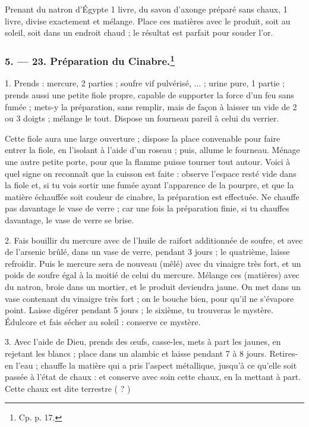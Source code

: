 \documentclass[a4paper, 11pt, oneside, polutonikogreek, french]{article}
\begin{document}
Prenant du natron d'Égypte 1 livre, du savon d'axonge préparé sans chaux, 1 livre, divise exactement et mélange. Place ces matières avec le produit, soit au soleil, soit dans un endroit chaud ; le résultat est parfait pour souder l'or.

\bigskip
\centerline{\EightStarTaper}
\centerline{\EightStarTaper\EightStarTaper}
\bigskip

\subsubsection[5. --- 23. Préparation du Cinabre.]{5. --- 23. Préparation du Cinabre.\footnote{Cp. p. 17.}}

1. Prends : mercure, 2 parties ; soufre vif pulvérisé, ... ; urine pure, 1 partie ; prends aussi une petite fiole propre, capable de supporter la force d'un feu sans fumée ; mets-y la préparation, sans remplir, mais de façon à laisser un vide de 2 ou 3 doigts ; mélange le tout. Dispose un fourneau pareil à celui du verrier.

Cette fiole aura une large ouverture ; dispose la place convenable pour faire entrer la fiole, en l'isolant à l'aide d'un roseau ; puis, allume le fourneau. Ménage une autre petite porte, pour que la flamme puisse tourner tout autour. Voici à quel signe on reconnaît que la cuisson est faite : observe l'espace resté vide dans la fiole et, si tu vois sortir une fumée ayant l'apparence de la pourpre, et que la matière échauffée soit couleur de cinabre, la préparation est effectuée. Ne chauffe pas davantage le vase de verre ; car une fois la préparation finie, si tu chauffes davantage, le vase de verre se brise.

2. Fais bouillir du mercure avec de l'huile de raifort additionnée de soufre, et avec de l'arsenic brûlé, dans un vase de verre, pendant 3 jours ; le quatrième, laisse refroidir. Puis le mercure sera de nouveau (mêlé) avec du vinaigre très fort, et un poids de soufre égal à la moitié de celui du mercure. Mélange ces (matières) avec du natron, broie dans un mortier, et le produit deviendra jaune. On met dans un vase contenant du vinaigre très fort ; on le bouche bien, pour qu'il ne s'évapore point. Laisse digérer pendant 5 jours ; le sixième, tu trouveras le mystère. Édulcore et fais sécher au soleil : conserve ce mystère.

3. Avec l'aide de Dieu, prends des œufs, casse-les, mets à part les jaunes, en rejetant les blancs ; place dans un alambic et laisse pendant 7 à 8 jours. Retires-en l'eau ; chauffe la matière qui a pris l'aspect métallique, jusqu'à ce qu'elle soit passée à l'état de chaux : et conserve avec soin cette chaux, en la mettant à part. Cette chaux est dite terrestre ( ? )
\end{document}

